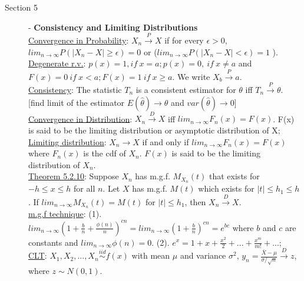 \documentclass[10pt,landscape]{article}
\begin{document}
\begin{multicols}{3}
   \begin{description}  %
	\item[Section 5] - \textbf{Consistency and Limiting Distributions} \\
	\underline{Convergence in Probability}: $X_n \overset{P}{\rightarrow} X$ if for every $\epsilon > 0$, $lim_{n\rightarrow\infty} P(|X_n - X| \geq \epsilon) = 0$  or ($lim_{n\rightarrow\infty} P(|X_n - X| < \epsilon) = 1$ ).\\
	\underline{Degenerate r.v.}: $p(x) = 1, if\ x=a; p(x) = 0,\ if\ x\neq a$ and $F(x) = 0\ if\ x<a; F(x) = 1\ if\ x\geq a$. We write $X_b \overset{P}{\rightarrow}  a$. \\
	\underline{Consistency}: The statistic $T_n$ is a consistent estimator for $\theta$ iff $T_n \overset{P}{\rightarrow} \theta$. [find limit of the estimator $E(\hat{\theta}) \rightarrow \theta$ and $var(\hat{\theta}) \rightarrow 0$]\\
	\underline{Convergence in Distribution}: $X_n \overset{D}{\rightarrow} X$ iff $lim_{n\rightarrow \infty} F_n(x) = F(x)$. F(x) is said to be the limiting distribution or asymptotic distribution of X; \\
	\underline{Limiting distribution}: $X_n \rightarrow X$ if and only if $lim_{n\rightarrow \infty} F_n(x) = F(x)$ where $F_n(x)$ is the cdf of $X_n$. $F(x)$ is said to be the limiting distribution of $X_n$. \\
	\underline{Theorem 5.2.10}: Suppose $X_n$ has m.g.f. $M_{X_n}(t)$ that exists for $-h\leq x \leq h$ for all $n$. Let $X$ has m.g.f. $M(t)$ which exists for $|t|\leq h_1 \leq h$. If $lim_{n\rightarrow \infty} M_{X_n}(t) = M(t)$ for $|t| \leq h_1$, then $X_n \overset{D}{\rightarrow} X$. \\
	\underline{m.g.f technique}: (1). $lim_{n\rightarrow \infty} (1 + \frac{b}{n} + \frac{\phi (n)}{n})^{cn} = lim_{n\rightarrow \infty} (1+\frac{b}{n})^{cn} = e^{bc}$ where $b$ and $c$ are constants and $lim_{n\rightarrow \infty} \phi(n) = 0$. (2). $e^x = 1 + x + \frac{x^2}{2} + ... + \frac{x^m}{m!} + ...$; \\
	\underline{CLT}: $X_1, X_2, ..., X_n \overset{iid}{\sim} f(x)$ with mean $\mu$ and variance $\sigma^2$, $y_n = \frac{\bar{X} - \mu }{\sigma / \sqrt{n}} \overset{D}{\rightarrow} z$, where $z \sim N(0, 1)$. \\
	
	
   \end{description} 
   

\end{multicols}
\end{document}
